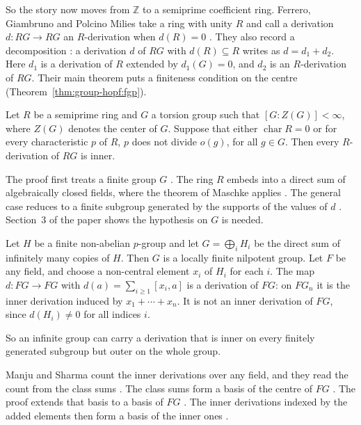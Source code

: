 So the story now moves from $\mathbb{Z}$ to a semiprime coefficient ring. Ferrero,
Giambruno and Polcino Milies take a ring with unity $R$ and call a derivation
$d\colon RG\to RG$ an $R$-derivation when $d(R)=0$ \cite[p.~434]{FerreroGiambrunoPolcinoMilies1995}.
They also record a decomposition \cite[p.~434]{FerreroGiambrunoPolcinoMilies1995}:
a derivation $d$ of $RG$ with $d(R)\subseteq R$ writes as $d=d_1+d_2$. Here $d_1$
is a derivation of $R$ extended by $d_1(G)=0$, and $d_2$ is an $R$-derivation of
$RG$. Their main theorem puts a finiteness condition on the centre (Theorem~\ref{thm:group-hopf:fgp}).

\begin{theorem}\label{thm:group-hopf:fgp}
Let $R$ be a semiprime ring and $G$ a torsion group such that $[G:Z(G)]<\infty$,
where $Z(G)$ denotes the center of $G$. Suppose that either $\operatorname{char}R=0$
or for every characteristic $p$ of $R$, $p$ does not divide $o(g)$, for all $g\in G$.
Then every $R$-derivation of $RG$ is inner.
\end{theorem}

The proof first treats a finite group $G$
\cite[pp.~434--436]{FerreroGiambrunoPolcinoMilies1995}. The ring $R$ embeds into
a direct sum of algebraically closed fields, where the theorem of Maschke applies
\cite[p.~435]{FerreroGiambrunoPolcinoMilies1995}. The general case reduces to a
finite subgroup generated by the supports of the values of $d$
\cite[pp.~434--436]{FerreroGiambrunoPolcinoMilies1995}. Section~3 of the paper
shows the hypothesis on $G$ is needed.

\begin{example}\label{ex:group-hopf:outer}
Let $H$ be a finite non-abelian $p$-group and let $G=\bigoplus_i H_i$ be the direct
sum of infinitely many copies of $H$. Then $G$ is a locally finite nilpotent group.
Let $F$ be any field, and choose a non-central element $x_i$ of $H_i$ for each $i$.
The map $d\colon FG\to FG$ with $d(a)=\sum_{i\ge1}[x_i,a]$ is a derivation of $FG$:
on $FG_n$ it is the inner derivation induced by $x_1+\cdots+x_n$. It is not an inner
derivation of $FG$, since $d(H_i)\neq0$ for all indices $i$.
\end{example}

So an infinite group can carry a derivation that is inner on every finitely
generated subgroup but outer on the whole group.

Manju and Sharma count the inner derivations over any field, and they read the
count from the class sums \cite[p.~5]{ManjuSharma2026}. The class sums
form a basis of the centre of $FG$ \cite[p.~5]{ManjuSharma2026}. The proof
extends that basis to a basis of $FG$
\cite[p.~5]{ManjuSharma2026}. The inner derivations indexed by the added
elements then form a basis of the inner ones \cite[p.~5]{ManjuSharma2026}.

